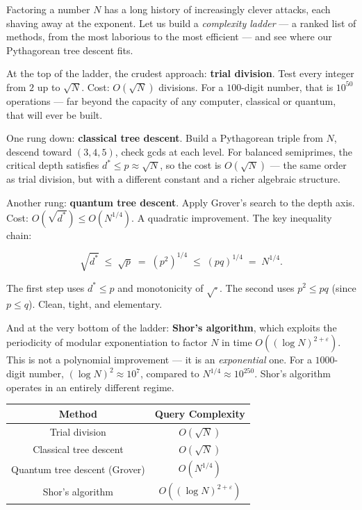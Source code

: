 \documentclass[12pt, letterpaper, openany]{book}
\theoremstyle{definition}
\theoremstyle{remark}
\begin{document}
Factoring a number $N$ has a long history of increasingly clever attacks, each shaving away at the exponent. Let us build a \textit{complexity ladder} --- a ranked list of methods, from the most laborious to the most efficient --- and see where our Pythagorean tree descent fits.

At the top of the ladder, the crudest approach: \textbf{trial division}. Test every integer from $2$ up to $\sqrt{N}$. Cost: $O(\sqrt{N})$ divisions. For a $100$-digit number, that is $10^{50}$ operations --- far beyond the capacity of any computer, classical or quantum, that will ever be built.

One rung down: \textbf{classical tree descent}. Build a Pythagorean triple from $N$, descend toward $(3, 4, 5)$, check gcds at each level. For balanced semiprimes, the critical depth satisfies $d^* \leq p \approx \sqrt{N}$, so the cost is $O(\sqrt{N})$ --- the same order as trial division, but with a different constant and a richer algebraic structure.

Another rung: \textbf{quantum tree descent}. Apply Grover's search to the depth axis. Cost: $O(\sqrt{d^*}) \leq O(N^{1/4})$. A quadratic improvement. The key inequality chain:

\[
\sqrt{d^*} \;\leq\; \sqrt{p} \;=\; (p^2)^{1/4} \;\leq\; (pq)^{1/4} \;=\; N^{1/4}.
\]

The first step uses $d^* \leq p$ and monotonicity of $\sqrt{\cdot}$. The second uses $p^2 \leq pq$ (since $p \leq q$). Clean, tight, and elementary.

And at the very bottom of the ladder: \textbf{Shor's algorithm}, which exploits the periodicity of modular exponentiation to factor $N$ in time $O((\log N)^{2+\varepsilon})$. This is not a polynomial improvement --- it is an \textit{exponential} one. For a $1000$-digit number, $(\log N)^2 \approx 10^7$, compared to $N^{1/4} \approx 10^{250}$. Shor's algorithm operates in an entirely different regime.


\begin{center}
\begin{tabular}{|c|c|}
\hline
Method & Query Complexity \\
\hline
Trial division & $O(\sqrt{N})$ \\
Classical tree descent & $O(\sqrt{N})$ \\
Quantum tree descent (Grover) & $O(N^{1/4})$ \\
Shor's algorithm & $O((\log N)^{2+\varepsilon})$ \\
\hline
\end{tabular}
\end{center}
\end{document}
